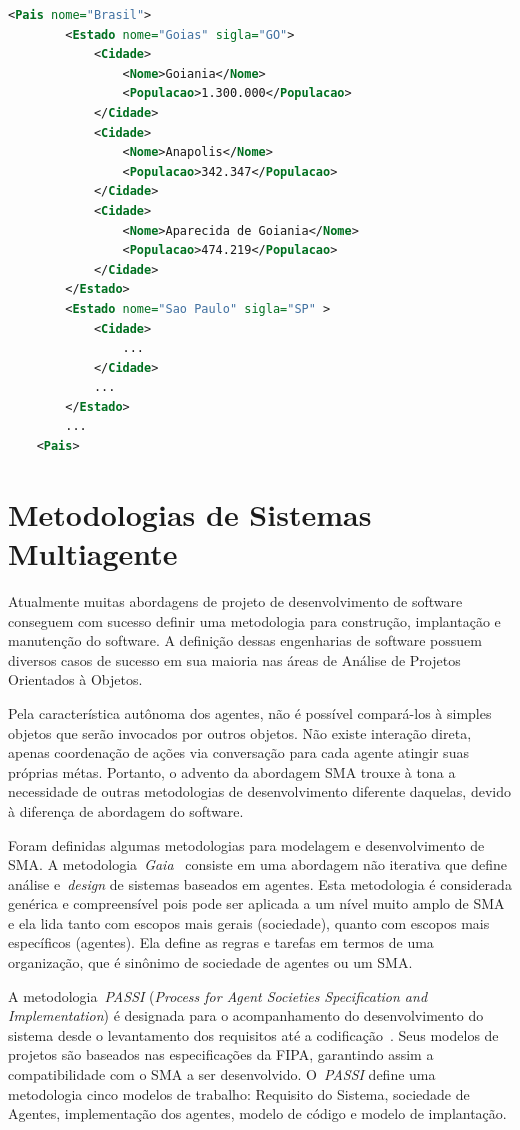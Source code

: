 \begin{lstlisting}[language=xml,label=code:exemplo-xml,caption=Representação uma ontologia simples de cidades.]
	<Pais nome="Brasil">
		<Estado nome="Goias" sigla="GO">
			<Cidade>
				<Nome>Goiania</Nome>
				<Populacao>1.300.000</Populacao>
			</Cidade>
			<Cidade>
				<Nome>Anapolis</Nome>
				<Populacao>342.347</Populacao>
			</Cidade>
			<Cidade>
				<Nome>Aparecida de Goiania</Nome>
				<Populacao>474.219</Populacao>
			</Cidade>
		</Estado>
		<Estado nome="Sao Paulo" sigla="SP" >
			<Cidade>
				...
			</Cidade>
			...
		</Estado>
		...
	<Pais>
\end{lstlisting}

\section{Metodologias de Sistemas Multiagente}\label{section:mase}

Atualmente muitas abordagens de projeto de desenvolvimento de software conseguem com sucesso definir uma metodologia para construção, implantação e manutenção do software. A definição dessas engenharias de software possuem diversos casos de sucesso em sua maioria nas áreas de Análise de Projetos Orientados à Objetos.

Pela característica autônoma dos agentes, não é possível compará-los à simples objetos que serão invocados por outros objetos. Não existe interação direta, apenas coordenação de ações via conversação para cada agente atingir suas próprias métas. Portanto, o advento da abordagem SMA trouxe à tona a necessidade de outras metodologias de desenvolvimento diferente daquelas, devido à diferença de abordagem do software.

Foram definidas algumas metodologias para modelagem e desenvolvimento de SMA. A metodologia~\emph{Gaia}~\cite{wooldridge2000} consiste em uma abordagem não iterativa que define análise e~\emph{design} de sistemas baseados em agentes. Esta metodologia é considerada genérica e compreensível pois pode ser aplicada a um nível muito amplo de SMA e ela lida tanto com escopos mais gerais (sociedade), quanto com escopos mais específicos (agentes). Ela define as regras e tarefas em termos de uma organização, que é sinônimo de sociedade de agentes ou um SMA.

A metodologia~\emph{PASSI} (\emph{Process for Agent Societies Specification and Implementation}) é designada para o acompanhamento do desenvolvimento do sistema desde o levantamento dos requisitos até a codificação~\cite{burrafato02}. Seus modelos de projetos são baseados nas especificações da FIPA, garantindo assim a compatibilidade com o SMA a ser desenvolvido. O~\emph{PASSI} define uma metodologia cinco modelos de trabalho: Requisito do Sistema, sociedade de Agentes, implementação dos agentes, modelo de código e modelo de implantação.

